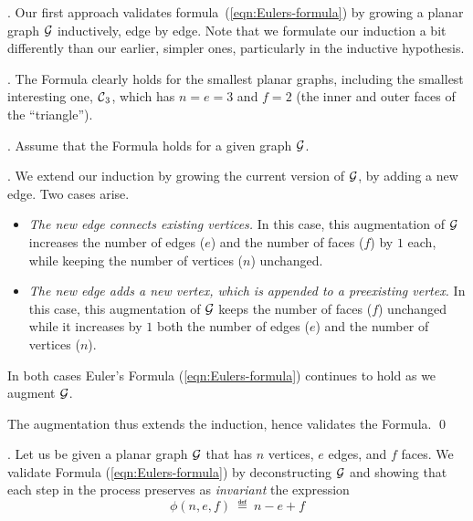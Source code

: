 . 
Our first approach validates formula~(\ref{eqn:Eulers-formula}) by growing a planar graph $\mbox{$\cal G$}$
inductively, edge by edge.  Note that we formulate our induction a bit differently than our earlier, simpler ones, particularly in the inductive hypothesis.

\smallskip

.
The Formula clearly holds for the smallest planar graphs, including the smallest interesting one, $\mbox{$\cal C$}_3$, which has $n = e = 3$ and $f =2$ (the inner and outer faces of the ``triangle'').

\smallskip

.
Assume that the Formula holds for a given graph $\mbox{$\cal G$}$.

\smallskip

.
We extend our induction by growing the current version of $\mbox{$\cal G$}$, by adding a new edge.  Two cases arise.
\begin{itemize}
\item
{\it The new edge connects existing vertices.}
In this case, this augmentation of $\mbox{$\cal G$}$ increases the number of edges ($e$) and the number of faces ($f$) by $1$ each, while keeping the number of vertices ($n$) unchanged.

\medskip\item
{\it The new edge adds a new vertex, which is appended to a preexisting vertex.}
In this case, this augmentation of $\mbox{$\cal G$}$ keeps the number of faces ($f$) unchanged while
it increases by $1$ both the number of edges ($e$) and the number of vertices ($n$). 
\end{itemize}
In both cases Euler's Formula (\ref{eqn:Eulers-formula}) continues to hold as we augment $\mbox{$\cal G$}$.  

The augmentation thus extends the induction, hence validates the Formula.  \qed

\bigskip


.
Let us be given a planar graph $\mbox{$\cal G$}$ that has $n$ vertices, $e$ edges, and $f$ faces.  We validate Formula (\ref{eqn:Eulers-formula}) by deconstructing $\mbox{$\cal G$}$ and showing that each step in the process preserves as {\it invariant} the expression
\begin{equation}
\label{eq:phi-in-euler-formula}
 \phi(n,e,f) \ \eqdef \ n-e+f
\end{equation}

